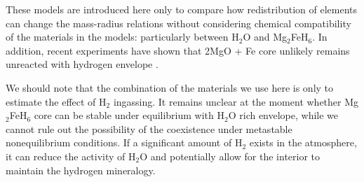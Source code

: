 \documentclass[draft,jgrga,12pt]{agujournal2019}
\begin{document}
These models are introduced here only to compare how redistribution of elements can change the mass-radius relations without considering chemical compatibility of the materials in the models: particularly between H$_2$O and Mg$_2$FeH$_6$.
In addition, recent experiments have shown that 2MgO + Fe core unlikely remains unreacted with hydrogen envelope \cite{kim_stability_2023}.
  
We should note that the combination of the materials we use here is only to estimate the effect of H$_2$ ingassing.
It remains unclear at the moment whether Mg$_2$FeH$_6$ core can be stable under equilibrium with H$_2$O rich envelope, while we cannot rule out the possibility of the coexistence under metastable nonequilibrium conditions.
If a significant amount of H$_2$ exists in the atmosphere, it can reduce the activity of H$_2$O and potentially allow for the interior to maintain the hydrogen mineralogy.

\end{document}
